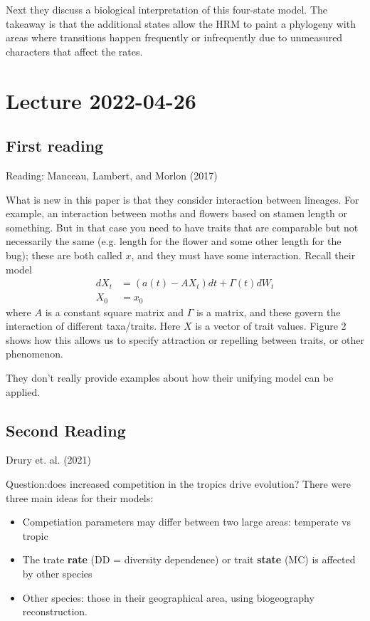 \documentclass{article}
\begin{document}
Next they discuss a biological interpretation of this four-state model. The
takeaway is that the additional states allow the HRM to paint a phylogeny with
areas where transitions happen frequently or infrequently due to unmeasured
characters that affect the rates.

\section{Lecture 2022-04-26}
\subsection{First reading}
Reading: Manceau, Lambert, and Morlon (2017)

What is new in this paper is that they consider interaction between lineages.
For example, an interaction between moths and flowers based on stamen length or
something. But in that case you need to have traits that are comparable but not
necessarily the same (e.g. length for the flower and some other length for the
bug); these are both called $x$, and they must have some interaction. Recall
their model
\begin{align*}
  dX_{t} 
  &= (a(t)-AX_{t})dt +\Gamma(t)dW_{t}\\
    X_{0}
  &= x_{0}
\end{align*}
where $A$ is a constant square matrix and $\Gamma$ is a matrix, and these govern
the interaction of different taxa/traits. Here $X$ is a vector of trait values.
Figure 2 shows how this allows us to specify attraction or repelling between
traits, or other phenomenon.

They don't really provide examples about how their unifying model can be
applied.
\subsection{Second Reading}
Drury et. al. (2021)

Question:does increased competition in the tropics drive evolution? There were
three main ideas for their models:
\begin{itemize}
\item Competiation parameters may differ between two large areas: temperate vs
tropic
\item The trate \textbf{rate} (DD = diversity dependence) or trait
\textbf{state} (MC) is affected by other species
\item Other species: those in their geographical area, using biogeography reconstruction.
\end{itemize}
\end{document}
